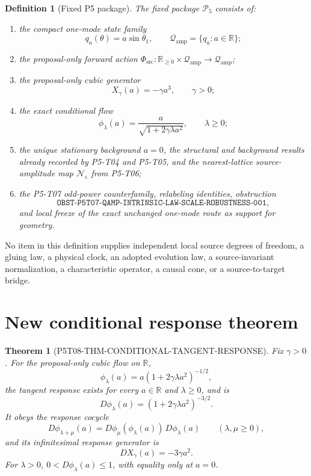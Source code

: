 \documentclass[11pt]{article}
\newtheorem{definition}{Definition}
\newtheorem{theorem}{Theorem}
\newcommand{\Qamp}{\mathcal Q_{\mathrm{amp}}}
\newcommand{\Phisrc}{\Phi_{\mathrm{src}}}
\begin{document}
\begin{definition}[Fixed P5 package]
The fixed package \(\mathcal P_5\) consists of:
\begin{enumerate}
  \item the compact one-mode state family
  \[
     q_a(\theta)=a\sin\theta_1,\qquad
     \Qamp=\{q_a:a\in\mathbb R\};
  \]
  \item the proposal-only forward action
  \(\Phisrc:\mathbb R_{\geq0}\times\Qamp\to\Qamp\);
  \item the proposal-only cubic generator
  \[
     X_\gamma(a)=-\gamma a^3,\qquad \gamma>0;
  \]
  \item the exact conditional flow
  \[
     \phi_\lambda(a)
       =\frac{a}{\sqrt{1+2\gamma\lambda a^2}},
       \qquad \lambda\geq0;
  \]
  \item the unique stationary background \(a=0\), the structural and
  background results already recorded by P5-T04 and P5-T05, and the
  nearest-lattice source-amplitude map \(\mathcal N_\varepsilon\) from
  P5-T06;
  \item the P5-T07 odd-power counterfamily, relabeling identities,
  obstruction
  \[
  \texttt{OBST-P5T07-QAMP-INTRINSIC-LAW-SCALE-ROBUSTNESS-001},
  \]
  and local freeze of the exact unchanged one-mode route as support for
  geometry.
\end{enumerate}
\end{definition}

No item in this definition supplies independent local source degrees of
freedom, a gluing law, a physical clock, an adopted evolution law, a
source-invariant normalization, a characteristic operator, a causal cone, or
a source-to-target bridge.

\section{New conditional response theorem}

\begin{theorem}[P5T08-THM-CONDITIONAL-TANGENT-RESPONSE]
\label{thm:response}
Fix \(\gamma>0\).  For the proposal-only cubic flow on \(\mathbb R\),
\[
 \phi_\lambda(a)=a(1+2\gamma\lambda a^2)^{-1/2},
\]
the tangent response exists for every \(a\in\mathbb R\) and
\(\lambda\geq0\), and is
\[
 D\phi_\lambda(a)
   =(1+2\gamma\lambda a^2)^{-3/2}.
\]
It obeys the response cocycle
\[
 D\phi_{\lambda+\mu}(a)
 =D\phi_\mu(\phi_\lambda(a))\,D\phi_\lambda(a)
 \qquad(\lambda,\mu\geq0),
\]
and its infinitesimal response generator is
\[
 DX_\gamma(a)=-3\gamma a^2.
\]
For \(\lambda>0\), \(0<D\phi_\lambda(a)\leq1\), with equality only at
\(a=0\).
\end{theorem}
\end{document}

